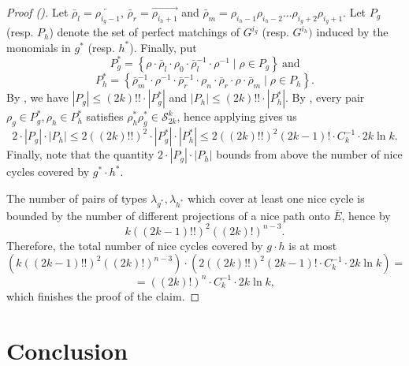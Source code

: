 \documentclass[11pt,a4paper]{article}
\newcommand{\sym}{\mathcal{S}}
\begin{document}
\begin{proof}[Proof ()]
    Let $\bar\rho_l = \overleftarrow{\rho_{i_g - 1}}$, $\bar\rho_r = \overrightarrow{\rho_{i_h+1}}$ and $\bar\rho_m = \rho_{i_h - 1}\rho_{i_h - 2}\dots\rho_{i_g + 2}\rho_{i_g + 1}$. Let $P_g$ (resp. $P_h$) denote the set of perfect matchings of $G^{i_g}$ (resp. $G^{i_h})$ induced by the monomials in $g^*$ (resp. $h^*$). Finally, put
    $$
        P_g^* = \left\{
            \rho \cdot
            \bar\rho_l \cdot 
            \rho_0 \cdot 
            \bar\rho_l^{-1} \cdot 
            \rho^{-1}
            \mid \rho \in P_g
        \right\} \ \text{and}
    $$
    $$
        P_h^* = \left\{
            \bar\rho_m^{-1} \cdot
            \rho^{-1} \cdot
            \bar\rho_r^{-1} \cdot 
            \rho_n \cdot 
            \bar\rho_r \cdot 
            \rho \cdot
            \bar\rho_m
            \mid \rho \in P_h
        \right\}.
    $$
    By , we have $|P_g| \leq (2k)!! \cdot |P_g^*|$ and $|P_h| \leq (2k)!! \cdot |P_h^*|$.
    By , every pair $\rho_g \in P_g^*, \rho_h \in P_h^*$ satisfies $\rho_h^* \rho_g^* \in \sym_{2k}^k$, hence applying  gives us
    $$
        2 \cdot |P_g| \cdot |P_h| \leq
        2 ((2k)!!)^2 \cdot |P_g^*| \cdot |P_h^*| \leq
        2 ((2k)!!)^2 (2k - 1)! \cdot C_k^{-1} \cdot 2k \ln k.
    $$
    Finally, note that the quantity $2 \cdot |P_g| \cdot |P_h|$ bounds from above the number of nice cycles covered by $g^* \cdot h^*$.

    The number of pairs of types $\lambda_{g^*}, \lambda_{h^*}$ which cover at least one nice cycle is bounded by the number of different projections of a nice path onto $\bar{E}$, hence by
    $$
    k ((2k - 1)!!)^2 ((2k)!)^{n - 3}.
    $$
    Therefore, the total number of nice cycles covered by $g \cdot h$ is at most
    $$
    \left( k ((2k - 1)!!)^2 ((2k)!)^{n - 3} \right) \cdot
    \left( 2 ((2k)!!)^2 (2k - 1)! \cdot C_k^{-1} \cdot 2k \ln k \right) =
    $$
    $$
    = ((2k)!)^n \cdot C_k^{-1} \cdot 2k \ln k,
    $$
    which finishes the proof of the claim.

\end{proof}



\section{Conclusion}
\label{sec:con}
\end{document}
